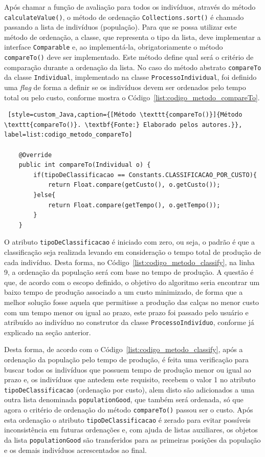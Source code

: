 \par Após chamar a função de avaliação para todos os indivíduos, através do método \texttt{calcul\-ateValue()}, o método
de ordenação \texttt{Collections.sort()} é chamado passando a lista de indivíduos (população). Para que se possa utilizar este método
de ordenação, a classe, que representa o tipo da lista, deve implementar a interface
\texttt{Comparable} e, ao implementá-la, obrigatoriamente o método \texttt{compareTo()} deve ser implementado. Este método
define qual será o critério de comparação durante a ordenação da lista. No caso do método abstrato \texttt{compareTo} da classe \texttt{Individual}, implementado na classe \texttt{ProcessoIndividual}, foi definido uma \textit{flag} de forma a
definir se os indivíduos devem ser ordenados pelo tempo total ou pelo custo, conforme mostra o Código~\ref{list:codigo_metodo_compareTo}.

\begin{lstlisting} [style=custom_Java,caption={[Método \texttt{compareTo()}]{Método \texttt{compareTo()}. \textbf{Fonte:} Elaborado pelos autores.}}, label=list:codigo_metodo_compareTo] 

	@Override
	public int compareTo(Individual o) {
		if(tipoDeClassificacao == Constants.CLASSIFICACAO_POR_CUSTO){
			return Float.compare(getCusto(), o.getCusto());
		}else{
			return Float.compare(getTempo(), o.getTempo());
		}
	}

\end{lstlisting}

\par O atributo \texttt{tipoDeClassificacao} é iniciado com zero, ou seja, o padrão é que a classificação seja realizada levando 
em consideração o tempo total de produção de cada indivíduo. Desta forma, no Código~\ref{list:codigo_metodo_classify}, na linha
9, a ordenação da população será com base no tempo de produção. A questão é que, de acordo com o escopo definido, o objetivo do 
algoritmo seria encontrar um baixo tempo de produção associado a um custo minimizado, de forma que a melhor solução fosse aquela
que permitisse a produção das calças no menor custo com um tempo menor ou igual ao prazo, este prazo foi passado pelo usuário e
atribuído ao indivíduo no construtor da classe \texttt{ProcessoIndivíduo}, conforme já explicado na seção anterior. 

\par Desta forma, de acordo com o Código~\ref{list:codigo_metodo_classify}, após a ordenação da população pelo tempo de produção, 
é feita uma verificação para buscar todos os indivíduos que possuem tempo de produção menor ou igual ao prazo e, os indivíduos que antedem este requisito, recebem o valor 1 no atributo \texttt{tipoDeClassificacao} (ordenação por custo), alem disto são adicionados a uma outra lista denominada \texttt{populationGood}, que também será ordenada, só que agora o critério de ordenação do método \texttt{compareTo()} passou ser o custo. Após esta ordenação o atributo \texttt{tipoDeClassificacao} é zerado para evitar possíveis inconsistência em futuras ordenações e, com ajuda de listas auxiliares, os objetos da lista \texttt{populationGood} são transferidos para as primeiras posições da população e os demais indivíduos acrescentados ao final.

